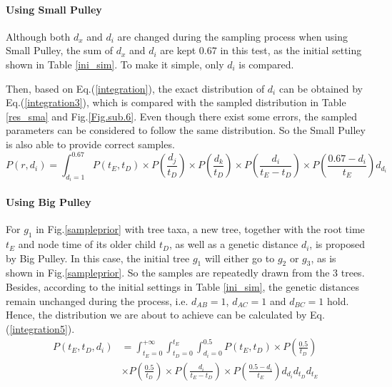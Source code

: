 \documentclass{bmcart}
\begin{document}
\paragraph*{Using Small Pulley}

Although both ${d_x}$ and ${d_i}$ are changed during the sampling process when using Small Pulley, the sum of ${d_x}$ and ${d_i}$ are kept 0.67 in this test, as the initial setting shown in Table \ref{ini_sim}. To make it simple, only ${d_i}$ is compared.

Then, based on Eq.(\ref{integration}), the exact distribution of ${d_i}$ can be obtained by Eq.(\ref{integration3}), which is compared with the sampled distribution in Table \ref{res_sma} and Fig.\ref{Fig.sub.6}. Even though there exist some errors, the sampled parameters can be considered to follow the same distribution. So the Small Pulley is also able to provide correct samples.
\begin{equation}\label{integration3}
P(r,{d_i}) = \int_{{d_i} = 1}^{0.67} {P({t_E},{t_D}) \times P(\frac{{{d_j}}}{{{t_D}}}) \times P(\frac{{{d_k}}}{{{t_D}}}) \times P(\frac{{{d_i}}}{{{t_E} - {t_D}}}) \times P(\frac{{0.67 - {d_i}}}{{{t_E}}}){d_{d_i}}}
\end{equation}

\paragraph*{Using Big Pulley}

For $g_1$ in Fig.\ref{sampleprior} with tree taxa, a new tree, together with the root time $t_E$ and node time of its older child $t_D$, as well as a genetic distance $d_i$, is proposed by Big Pulley. In this case, the initial tree $g_1$ will either go to $g_2$ or $g_3$, as is shown in Fig.\ref{sampleprior}.  So the samples are repeatedly drawn from the 3 trees. Besides, according to the initial settings in Table \ref{ini_sim}, the genetic distances remain unchanged during the process, i.e. $d_{AB} = 1$, $d_{AC}  = 1$ and $d_{BC} = 1$ hold. Hence, the distribution we are about to achieve can be calculated by Eq.(\ref{integration5}).
\begin{equation}\label{integration5}
\begin{aligned}
P({t_E},{t_D},{d_i}) &= \int_{{t_E} = 0}^{ + \infty } {\int_{{t_D} = 0}^{{t_E}} {\int_{{d_i} = 0}^{0.5} {P({t_E},{t_D})} } \times P(\frac{{0.5}}{{{t_D}}})}  \\&\times P(\frac{{0.5}}{{{t_D}}}) \times P(\frac{{{d_i}}}{{{t_E} - {t_D}}}) \times P(\frac{{0.5 - {d_i}}}{{{t_E}}}){d_{d_i}}{d_{t_D}}{d_{t_E}}
\end{aligned}
\end{equation}
\end{document}
